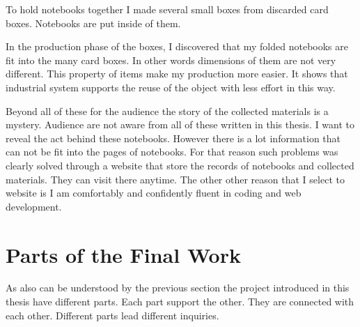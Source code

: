To hold notebooks together I made several small boxes from discarded card boxes. Notebooks are put inside of them.

In the production phase of the boxes, I discovered that my folded notebooks are fit into the many card boxes. In other words dimensions of them are not very different. This property of items make my production more easier. It shows that industrial system supports the reuse of the object with less effort in this way.









Beyond all of these for the audience the story of the collected materials is a mystery. Audience are not aware from all of these written in this thesis. I want to reveal the act behind these notebooks. However there is a lot information that can not be fit into the pages of notebooks. For that reason such problems was clearly solved through a website that store the records of notebooks and collected materials. They can visit there anytime. The other other reason that I select to website is I am comfortably and confidently fluent in coding and web development.





%
%
\section{Parts of the Final Work}
As also can be understood by the previous section the project introduced in this thesis have different parts. Each part support the other. They are connected with each other. Different parts lead different inquiries.





